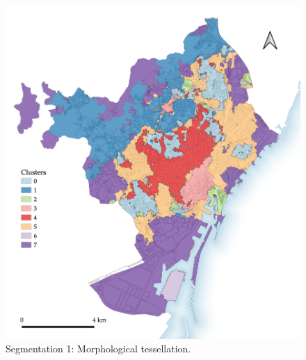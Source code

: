 \documentclass[a4paper, nobind]{templates/ociamthesis}
\begin{document}
\begin{figure}

{\centering \includegraphics[width=.8\paperwidth]{figures/maps/MT_8cls_5sw 8} 

}

\caption[Segmentation 1: Morphological tessellation.]{Segmentation 1: Morphological tessellation.}\label{fig:MT-map-BCN}
\end{figure}
\end{document}
